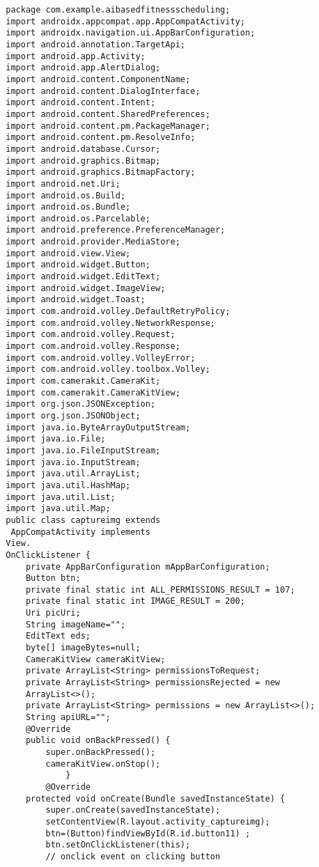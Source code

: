 \documentclass[a4paper,12pt,toc=flat]{report}
\begin{document}
{{{{\begin{itemize}
\begin{verbatim}
 		package com.example.aibasedfitnessscheduling;
 		import androidx.appcompat.app.AppCompatActivity;
 		import androidx.navigation.ui.AppBarConfiguration;
 		import android.annotation.TargetApi;
 		import android.app.Activity;
 		import android.app.AlertDialog;
 		import android.content.ComponentName;
 		import android.content.DialogInterface;
 		import android.content.Intent;
 		import android.content.SharedPreferences;
 		import android.content.pm.PackageManager;
 		import android.content.pm.ResolveInfo;
 		import android.database.Cursor;
 		import android.graphics.Bitmap;
 		import android.graphics.BitmapFactory;
 		import android.net.Uri;
 		import android.os.Build;
 		import android.os.Bundle;
 		import android.os.Parcelable;
 		import android.preference.PreferenceManager;
 		import android.provider.MediaStore;
 		import android.view.View;
 		import android.widget.Button;
 		import android.widget.EditText;
 		import android.widget.ImageView;
 		import android.widget.Toast;
 		import com.android.volley.DefaultRetryPolicy;
 		import com.android.volley.NetworkResponse;
 		import com.android.volley.Request;
 		import com.android.volley.Response;
 		import com.android.volley.VolleyError;
 		import com.android.volley.toolbox.Volley;
 		import com.camerakit.CameraKit;
 		import com.camerakit.CameraKitView;
 		import org.json.JSONException;
 		import org.json.JSONObject;
 		import java.io.ByteArrayOutputStream;
 		import java.io.File;
 		import java.io.FileInputStream;
 		import java.io.InputStream;
 		import java.util.ArrayList;
 		import java.util.HashMap;
 		import java.util.List;
 		import java.util.Map;
 		public class captureimg extends
 		 AppCompatActivity implements 
 		View.
 		OnClickListener {
 			private AppBarConfiguration mAppBarConfiguration;
 			Button btn;
 			private final static int ALL_PERMISSIONS_RESULT = 107;
 			private final static int IMAGE_RESULT = 200;
 			Uri picUri;
 			String imageName="";
 			EditText eds;
 			byte[] imageBytes=null;
 			CameraKitView cameraKitView;
 			private ArrayList<String> permissionsToRequest;
 			private ArrayList<String> permissionsRejected = new 
 			ArrayList<>();
 			private ArrayList<String> permissions = new ArrayList<>();
 			String apiURL="";
 			@Override
 			public void onBackPressed() {
 				super.onBackPressed();
 				cameraKitView.onStop();
 					}
 				@Override
 			protected void onCreate(Bundle savedInstanceState) {
 				super.onCreate(savedInstanceState);
 				setContentView(R.layout.activity_captureimg);
 				btn=(Button)findViewById(R.id.button11) ;
 				btn.setOnClickListener(this);
 				// onclick event on clicking button
 				

\end{verbatim}
\end{itemize}}}}}
\end{document}
